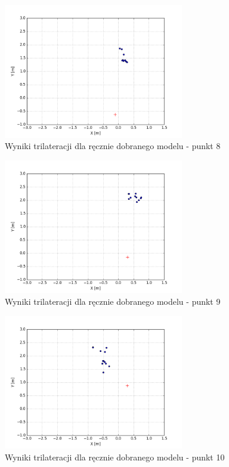 \begin{figure}[H]
\centering
\includegraphics[width=0.7\textwidth]{img/trilat-map3-8.png}
\caption{Wyniki trilateracji dla ręcznie dobranego modelu - punkt 8}
\end{figure}
\begin{figure}[H]
\centering
\includegraphics[width=0.7\textwidth]{img/trilat-map3-9.png}
\caption{Wyniki trilateracji dla ręcznie dobranego modelu - punkt 9}
\end{figure}
\begin{figure}[H]
\centering
\includegraphics[width=0.7\textwidth]{img/trilat-map3-10.png}
\caption{Wyniki trilateracji dla ręcznie dobranego modelu - punkt 10}
\end{figure}
